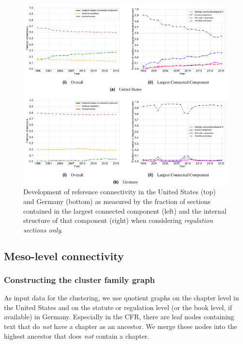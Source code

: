 \documentclass[utf8,sort&compress,numbers,square,table,hidelinks]{frontiers_suppmat} %
\begin{document}
\begin{figure}
	\centering
	\includegraphics[width=\textwidth]{figure_si_connectivity_regulations}
	\caption{Development of reference connectivity in the United States (top) and Germany (bottom) as measured by the fraction of sections contained in the largest connected component (left) and the internal structure of that component (right) when considering \emph{regulation sections only}.}\label{fig:connectivity-regulations}
\end{figure}

\subsection{Meso-level connectivity}

\vspace*{6pt}
\subsubsection{Constructing the cluster family graph}

As input data for the clustering, we use quotient graphs on the chapter level in the United States and on the statute or regulation level (or the book level, if available) in Germany.
Especially in the CFR, there are leaf nodes containing text that do \emph{not} have a chapter as an ancestor.
We merge these nodes into the highest ancestor that does \emph{not} contain a chapter.
\end{document}

